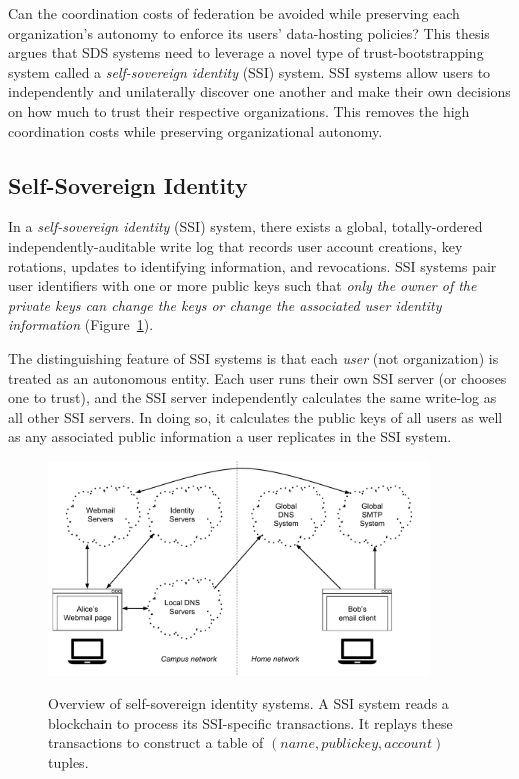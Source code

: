 Can the coordination costs of federation be avoided while
preserving each organization's autonomy to enforce its users' data-hosting
policies?  This thesis argues that SDS systems need to leverage a
novel type of trust-bootstrapping system called a \emph{self-sovereign identity}
(SSI) system.  SSI systems allow users to independently and unilaterally
discover one another and make their own decisions on how much to trust their
respective organizations.  This removes the high coordination costs while preserving
organizational autonomy.

\subsection{Self-Sovereign Identity}
\label{sec:chap2-ssi}

In a \emph{self-sovereign identity} (SSI) system, there exists a global,
totally-ordered independently-auditable write log that records user account creations, key rotations,
updates to identifying information, and revocations.  SSI systems 
pair user identifiers with one or more public keys such that \emph{only the 
owner of the private keys can 
change the keys or change the associated user identity information}
(Figure~\ref{fig:chap2-ssi-system}).

The distinguishing feature of SSI systems is that each \emph{user} (not
organization) is treated as an autonomous entity.  Each user runs their own
SSI server (or chooses one to trust), and the SSI server independently
calculates the same write-log as all other SSI servers.
In doing so, it calculates the public keys of all users as well as any
associated public information a user replicates in the SSI system.

\begin{figure}[h!]
   \caption{Overview of self-sovereign identity systems.  A SSI system reads a
   blockchain to process its SSI-specific transactions.  It replays these
   transactions to construct a table of $(name, public key, account)$ tuples.}
   \centering
   \includegraphics[width=0.9\textwidth,page=14]{figures/dissertation-figures}
   \label{fig:chap2-ssi-system}
\end{figure}

